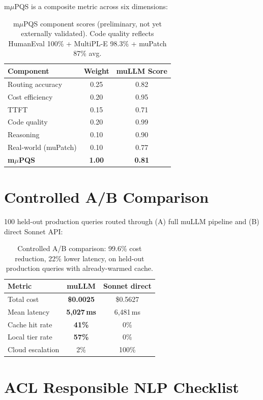 \documentclass[11pt]{article}
\begin{document}
m$\mu$PQS is a composite metric across six dimensions:

\begin{table}[h]
\centering
\small
\begin{tabular}{lcc}
\toprule
\textbf{Component} & \textbf{Weight} & \textbf{muLLM Score} \\
\midrule
Routing accuracy & 0.25 & 0.82 \\
Cost efficiency & 0.20 & 0.95 \\
TTFT & 0.15 & 0.71 \\
Code quality & 0.20 & 0.99 \\
Reasoning & 0.10 & 0.90 \\
Real-world (muPatch) & 0.10 & 0.77 \\
\midrule
\textbf{m$\mu$PQS} & \textbf{1.00} & \textbf{0.81} \\
\bottomrule
\end{tabular}
\caption{m$\mu$PQS component scores (preliminary, not yet externally
validated). Code quality reflects HumanEval 100\% + MultiPL-E 98.3\% +
muPatch 87\% avg.}
\label{tab:mpqs}
\end{table}

\section{Controlled A/B Comparison}

100 held-out production queries routed through (A) full muLLM pipeline
and (B) direct Sonnet API:

\begin{table}[h]
\centering
\small
\begin{tabular}{lcc}
\toprule
\textbf{Metric} & \textbf{muLLM} & \textbf{Sonnet direct} \\
\midrule
Total cost & \textbf{\$0.0025} & \$0.5627 \\
Mean latency & \textbf{5,027\,ms} & 6,481\,ms \\
Cache hit rate & \textbf{41\%} & 0\% \\
Local tier rate & \textbf{57\%} & 0\% \\
Cloud escalation & 2\% & 100\% \\
\bottomrule
\end{tabular}
\caption{Controlled A/B comparison: 99.6\% cost reduction, 22\% lower
latency, on held-out production queries with already-warmed cache.}
\label{tab:ab}
\end{table}

\section{ACL Responsible NLP Checklist}
\end{document}
